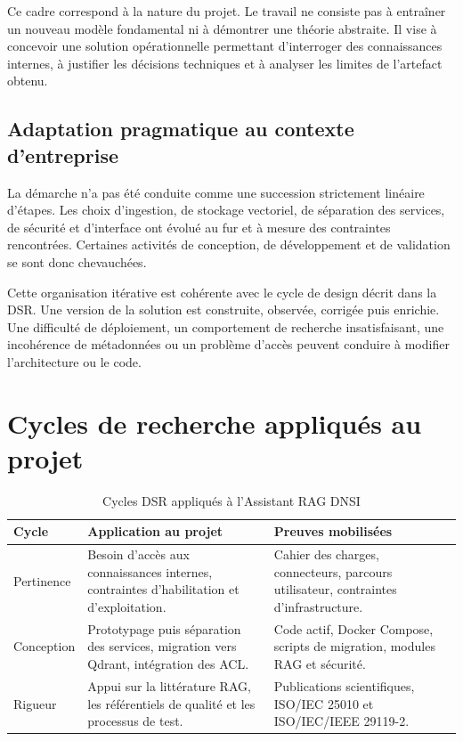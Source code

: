 Ce cadre correspond à la nature du projet. Le travail ne consiste pas à entraîner un nouveau modèle fondamental ni à démontrer une théorie abstraite. Il vise à concevoir une solution opérationnelle permettant d'interroger des connaissances internes, à justifier les décisions techniques et à analyser les limites de l'artefact obtenu.

\subsection{Adaptation pragmatique au contexte d'entreprise}

La démarche n'a pas été conduite comme une succession strictement linéaire d'étapes. Les choix d'ingestion, de stockage vectoriel, de séparation des services, de sécurité et d'interface ont évolué au fur et à mesure des contraintes rencontrées. Certaines activités de conception, de développement et de validation se sont donc chevauchées.

Cette organisation itérative est cohérente avec le cycle de design décrit dans la DSR. Une version de la solution est construite, observée, corrigée puis enrichie. Une difficulté de déploiement, un comportement de recherche insatisfaisant, une incohérence de métadonnées ou un problème d'accès peuvent conduire à modifier l'architecture ou le code.

\section{Cycles de recherche appliqués au projet}

\begin{table}[H]
\centering
\caption{Cycles DSR appliqués à l'Assistant RAG DNSI}
\label{tab:dsr_cycles_ch3}
\begin{tabular}{p{2.5cm}p{5.2cm}p{5.4cm}}
\toprule
\textbf{Cycle} & \textbf{Application au projet} & \textbf{Preuves mobilisées} \\
\midrule
Pertinence & Besoin d'accès aux connaissances internes, contraintes d'habilitation et d'exploitation. & Cahier des charges, connecteurs, parcours utilisateur, contraintes d'infrastructure. \\
Conception & Prototypage puis séparation des services, migration vers Qdrant, intégration des ACL. & Code actif, Docker Compose, scripts de migration, modules RAG et sécurité. \\
Rigueur & Appui sur la littérature RAG, les référentiels de qualité et les processus de test. & Publications scientifiques, ISO/IEC 25010 et ISO/IEC/IEEE 29119-2. \\
\bottomrule
\end{tabular}
\end{table}

